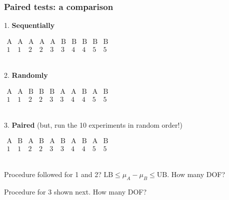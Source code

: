 \begin{frame}\frametitle{Paired tests: a comparison}

	1. \textbf{Sequentially} {\color{myOrange}{(don't ever do this!)}}

	$
	\begin{array}{cccccccccc}
		\text{A} & \text{A} & \text{A} & \text{A} & \text{A} & \text{B} & \text{B} & \text{B} & \text{B} & \text{B} \\
		1 & 1 & 2 & 2 & 3 & 3 & 4 & 4 & 5 & 5\\
	\end{array}
	$

	$\qquad$

	2. \textbf{Randomly} {\color{myOrange}{(commonality between pairs will not cancel)}}

	$
	\begin{array}{cccccccccc}
		\text{A} & \text{A} & \text{B} & \text{B} & \text{B} & \text{A} & \text{A} & \text{B} & \text{A} & \text{B} \\
		1 & 1 & 2 & 2 & 3 & 3 & 4 & 4 & 5 & 5\\
	\end{array}
	$

	$\qquad$

	3. \textbf{Paired} (but, run the 10 experiments in random order!)

	$
	\begin{array}{cccccccccc}
		\text{A} & \text{B} & \text{A} & \text{B} & \text{A} & \text{B} & \text{A} & \text{B} & \text{A} & \text{B} \\
		1 & 1 & 2 & 2 & 3 & 3 & 4 & 4 & 5 & 5\\
	\end{array}
	$

	$\qquad$

	Procedure followed for 1 and 2? $\text{LB} \leq \mu_A - \mu_B \leq \text{UB}$. How many DOF?

	Procedure for 3 shown next. How many DOF?
\end{frame}

